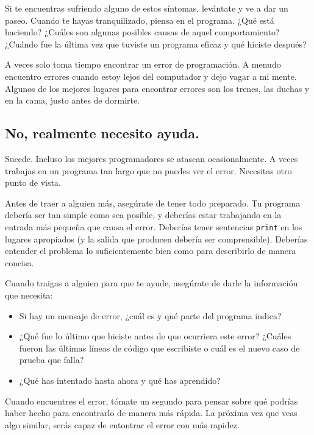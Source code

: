 \documentclass[10pt]{book}
\begin{document}
Si te encuentras sufriendo alguno de estos síntomas, levántate
y ve a dar un paseo.  Cuando te hayas tranquilizado, piensa en el programa.
¿Qué está haciendo?  ¿Cuáles son algunas posibles causas de aquel
comportamiento?  ¿Cuándo fue la última vez que tuviste un programa eficaz
y qué hiciste después?

A veces solo toma tiempo encontrar un error de programación.  A menudo
encuentro errores cuando estoy lejos del computador y dejo vagar a mi mente.
Algunos de los mejores lugares para encontrar errores son los trenes, las
duchas y en la cama, justo antes de dormirte.


\subsection{No, realmente necesito ayuda.}

Sucede.  Incluso los mejores programadores se atascan ocasionalmente.
A veces trabajas en un programa tan largo que no puedes ver el
error.  Necesitas otro punto de vista.

Antes de traer a alguien más, asegúrate de tener todo preparado.
Tu programa debería ser tan simple
como sea posible, y deberías estar trabajando en la entrada más pequeña
que causa el error.  Deberías tener sentencias {\tt print} en los
lugares apropiados (y la salida que producen debería ser
comprensible).  Deberías entender el problema lo suficientemente bien
como para describirlo de manera concisa.

Cuando traigas a alguien para que te ayude, asegúrate de darle
la información que necesita:

\begin{itemize}

\item Si hay un mensaje de error, ¿cuál es
y qué parte del programa indica?

\item ¿Qué fue lo último que hiciste antes de que ocurriera este error?
¿Cuáles fueron las últimas líneas de código que escribiste o cuál es
el nuevo caso de prueba que falla?

\item ¿Qué has intentado hasta ahora y qué has aprendido?

\end{itemize}

Cuando encuentres el error, tómate un segundo para pensar sobre qué
podrías haber hecho para encontrarlo de manera más rápida.  La próxima vez
que veas algo similar, serás capaz de entontrar el error con más rapidez.
\end{document}
